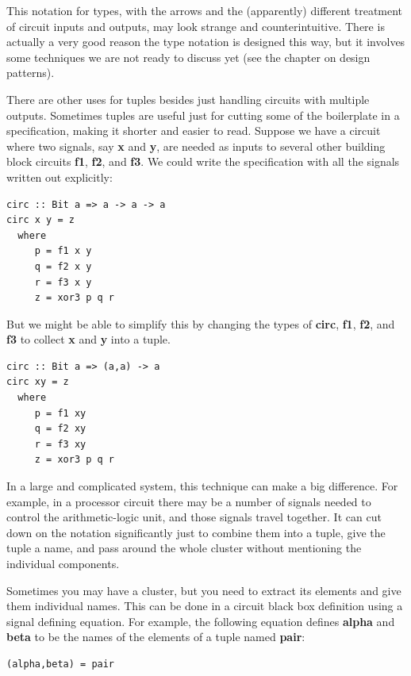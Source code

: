 \documentclass[]{svmono}
\begin{document}
This notation for types, with the arrows and the (apparently)
different treatment of circuit inputs and outputs, may look strange
and counterintuitive.  There is actually a very good reason the type
notation is designed this way, but it involves some techniques we are
not ready to discuss yet (see the chapter on design patterns).

There are other uses for tuples besides just handling circuits with
multiple outputs.  Sometimes tuples are useful just for cutting some
of the boilerplate in a specification, making it shorter and easier to
read.  Suppose we have a circuit where two signals, say \textbf{x} and \textbf{y},
are needed as inputs to several other building block circuits \textbf{f1},
\textbf{f2}, and \textbf{f3}.  We could write the specification with all the signals
written out explicitly:

\begin{verbatim}
circ :: Bit a => a -> a -> a
circ x y = z
  where
     p = f1 x y
     q = f2 x y
     r = f3 x y
     z = xor3 p q r
\end{verbatim}

But we might be able to simplify this by changing the types of \textbf{circ},
\textbf{f1}, \textbf{f2}, and \textbf{f3} to collect \textbf{x} and \textbf{y} into a tuple.

\begin{verbatim}
circ :: Bit a => (a,a) -> a
circ xy = z
  where
     p = f1 xy
     q = f2 xy
     r = f3 xy
     z = xor3 p q r
\end{verbatim}

In a large and complicated system, this technique can make a big
difference.  For example, in a processor circuit there may be a number
of signals needed to control the arithmetic-logic unit, and those
signals travel together.  It can cut down on the notation
significantly just to combine them into a tuple, give the tuple a
name, and pass around the whole cluster without mentioning the
individual components.

Sometimes you may have a cluster, but you need to extract its elements
and give them individual names.  This can be done in a circuit black
box definition using a signal defining equation.  For example, the
following equation defines \textbf{alpha} and \textbf{beta} to be the names of the
elements of a tuple named \textbf{pair}:

\begin{verbatim}
(alpha,beta) = pair
\end{verbatim}
\end{document}

